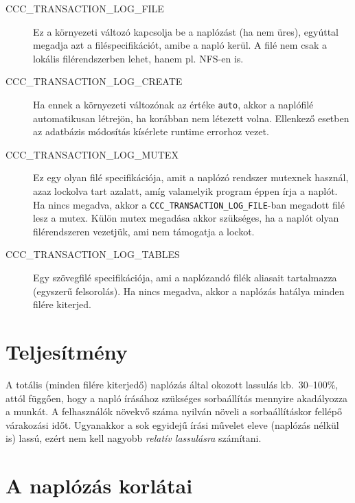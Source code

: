 \begin{description}
  \item[CCC\_TRANSACTION\_LOG\_FILE]       
    Ez a környezeti változó kapcsolja be a naplózást (ha nem üres),
    egyúttal megadja azt a filéspecifikációt, amibe a napló kerül.
    A filé nem csak a lokális filérendszerben lehet, hanem pl. 
    NFS-en is.
    \par

  \item[CCC\_TRANSACTION\_LOG\_CREATE]  
    Ha ennek a környezeti változónak az értéke \verb!auto!, akkor
    a naplófilé automatikusan létrejön, ha korábban nem létezett volna.
    Ellenkező esetben az adatbázis módosítás kísérlete runtime
    errorhoz vezet.
    \par


\item[CCC\_TRANSACTION\_LOG\_MUTEX]   
    Ez egy olyan filé specifikációja, amit a naplózó rendszer mutexnek
    használ, azaz lockolva tart azalatt, amíg valamelyik program éppen
    írja a naplót. Ha nincs megadva, akkor a
    \verb!CCC_TRANSACTION_LOG_FILE!-ban megadott filé lesz a mutex.
    Külön mutex megadása akkor szükséges, ha a naplót olyan
    filérendszeren vezetjük, ami nem támogatja a lockot.
    \par

\item[CCC\_TRANSACTION\_LOG\_TABLES]   
    Egy szövegfilé specifikációja, ami a naplózandó filék
    aliasait tartalmazza (egyszerű felsorolás). Ha nincs megadva,
    akkor a naplózás hatálya minden filére kiterjed.
    \par
\end{description}
 
\section{Teljesítmény}

A totális (minden filére kiterjedő) naplózás által okozott lassulás 
kb.\ 30--100\%, attól függően, hogy a napló írásához szükséges sorbaállítás 
mennyire akadályozza a munkát. A felhasználók növekvő száma
nyilván növeli a sorbaállításkor fellépő várakozási időt.
Ugyanakkor a sok egyidejű írási művelet eleve (naplózás nélkül is) 
lassú, ezért nem kell nagyobb {\em relatív lassulásra} számítani.


\section{A naplózás korlátai}

